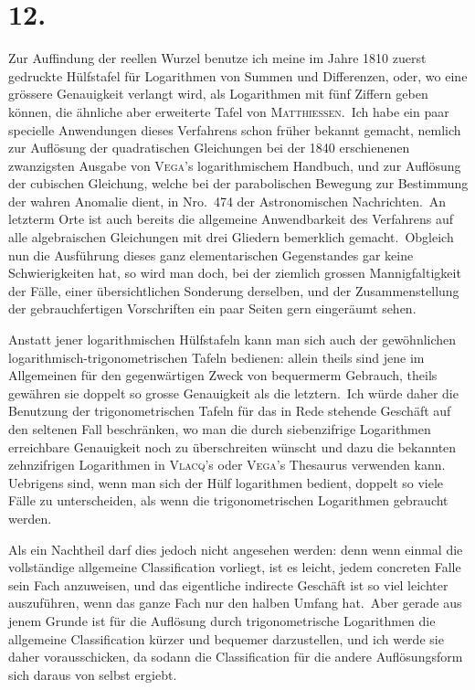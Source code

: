 \documentclass[12pt,a4paper]{article}
\theoremstyle{plain}
\begin{document}
\section*{12.}

Zur Auffindung der reellen Wurzel benutze ich meine im Jahre 1810 zuerst
gedruckte Hülfstafel für Logarithmen von Summen und Differenzen, oder, wo
eine grössere Genauigkeit verlangt wird, als Logarithmen mit fünf Ziffern geben
können, die ähnliche aber erweiterte Tafel von \textsc{Matthiessen}.\ Ich habe ein paar
specielle Anwendungen dieses Verfahrens schon früher bekannt gemacht, nemlich
zur Auflösung der quadratischen Gleichungen bei der 1840 erschienenen zwanzigsten Ausgabe von \textsc{Vega}'s logarithmischem Handbuch, und zur Auflösung der
cubischen Gleichung, welche bei der parabolischen Bewegung zur Bestimmung
der wahren Anomalie dient, in Nro.\ 474 der Astronomischen Nachrichten.\ An
letzterm Orte ist auch bereits die allgemeine Anwendbarkeit des Verfahrens auf
alle algebraischen Gleichungen mit drei Gliedern bemerklich gemacht.\ Obgleich
nun die Ausführung dieses ganz elementarischen Gegenstandes gar keine Schwierigkeiten hat, so wird man doch, bei der ziemlich grossen Mannigfaltigkeit der
Fälle, einer übersichtlichen Sonderung derselben, und der Zusammenstellung der
gebrauchfertigen Vorschriften ein paar Seiten gern eingeräumt sehen.

Anstatt jener logarithmischen Hülfstafeln kann man sich auch der gewöhnlichen logarithmisch-trigonometrischen Tafeln bedienen: allein theils sind jene
im Allgemeinen für den gegenwärtigen Zweck von bequermerm Gebrauch, theils
gewähren sie doppelt so grosse Genauigkeit als die letztern.\ Ich würde daher die
Benutzung der trigonometrischen Tafeln für das in Rede stehende Geschäft auf
den seltenen Fall beschränken, wo man die durch siebenzifrige Logarithmen erreichbare Genauigkeit noch zu überschreiten wünscht und dazu die bekannten
zehnzifrigen Logarithmen in \textsc{Vlacq}'s oder \textsc{Vega}'s Thesaurus verwenden kann.
Uebrigens sind, wenn man sich der Hülf logarithmen bedient, doppelt so viele
Fälle zu unterscheiden, als wenn die trigonometrischen Logarithmen gebraucht
werden.

Als ein Nachtheil darf dies jedoch nicht angesehen werden: denn wenn
einmal die vollständige allgemeine Classification vorliegt, ist es leicht, jedem concreten Falle sein Fach anzuweisen, und das eigentliche indirecte Geschäft ist so
viel leichter auszuführen, wenn das ganze Fach nur den halben Umfang hat.\ Aber
gerade aus jenem Grunde ist für die Auflösung durch trigonometrische Logarithmen die allgemeine Classification kürzer und bequemer darzustellen, und ich werde
sie daher vorausschicken, da sodann die Classification für die andere Auflösungsform sich daraus von selbst ergiebt.
\end{document}
